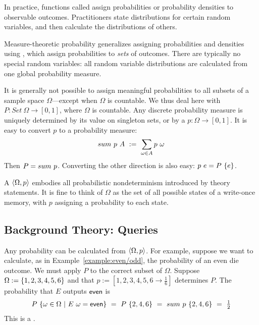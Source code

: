 In practice, functions called  assign probabilities or probability densities to observable outcomes. Practitioners state distributions for certain random variables, and then calculate the distributions of others.

Measure-theoretic probability generalizes assigning probabilities and densities using , which assign probabilities to \textit{sets} of outcomes. There are typically no special random variables: all random variable distributions are calculated from one global probability measure.

It is generally not possible to assign meaningful probabilities to all subsets of a sample space $\Omega$---except when $\Omega$ is countable. We thus deal here with  $P : Set~\Omega \to [0,1]$, where $\Omega$ is countable. Any discrete probability measure is uniquely determined by its value on singleton sets, or by a  $p : \Omega \to [0,1]$. It is easy to convert $p$ to a probability measure:
\begin{equation}
	\prob~p~A\ :=\ \sum_{\omega \in A} p~\omega
\end{equation}
Then $P = sum~p$. Converting the other direction is also easy: $p~e = P~\{{e}\}$.

A  $\langle{\Omega,p}\rangle$ embodies all probabilistic nondeterminism introduced by theory statements. It is fine to think of $\Omega$ as the set of all possible states of a write-once memory, with $p$ assigning a probability to each state.

\subsection{Background Theory: Queries}

Any probability can be calculated from $\langle{\Omega,p}\rangle$. For example, suppose we want to calculate, as in Example~\ref{example:even/odd}, the probability of an even die outcome. We must apply $P$ to the correct subset of $\Omega$. Suppose $\Omega := \{{1,2,3,4,5,6}\}$ and that $p := [1,2,3,4,5,6 \to \tfrac{1}{6}]$ determines $P$. The probability that $E$ outputs $\mathsf{even}$ is
\begin{equation}
	{P}\ {\lbrace {\omega\in\Omega} \ \lvert\ {{E}\ {\omega} = \mathsf{even}} \rbrace}
		\ =\ {P}\ {\{{2,4,6}\}}
		\ =\ {sum}\ {p}\ {\{{2,4,6}\}}
		\ =\ \tfrac{1}{2}
\label{eqn:example-prob-query}
\end{equation}
This is a .

